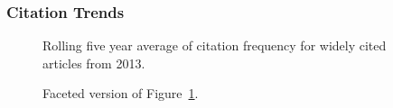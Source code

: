 \documentclass[
  10pt,
  letterpaper,
  DIV=11,
  numbers=noendperiod,
  twoside]{scrartcl}
\begin{document}
\subsubsection*{Citation Trends}\label{citation-trends-37}

\begin{figure}


\caption{\label{fig-citation-spaghetti-2013}Rolling five year average of
citation frequency for widely cited articles from 2013.}

\end{figure}%

\begin{figure}


\caption{\label{fig-citation-facet-2013}Faceted version of
Figure~\ref{fig-citation-spaghetti-2013}.}

\end{figure}%
\end{document}
